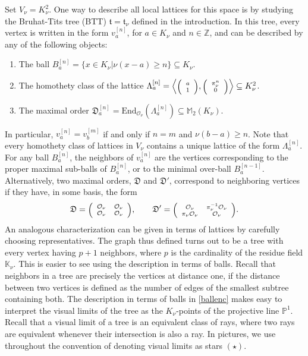 \documentclass{article}
\theoremstyle{definition}
\theoremstyle{remark}
\newcommand\sbmattrix[4]{\textnormal{\scriptsize$\left(\begin{array}{cc}#1&#2\\#3&#4\end{array}\right)$\normalsize}}
\newcommand\sbvecttor[2]{\textnormal{\scriptsize$\left(\begin{array}{cc}#1\\#2\end{array}\right)$\normalsize}}
\begin{document}
Set $V_{\nu}=K_{\nu}^2$. One way to describe all local 
lattices for this space
is by studying the Bruhat-Tits tree (BTT) 
$\mathfrak{t}=\mathfrak{t}_\nu$ defined in the
introduction. In this tree, every vertex is written 
in the form $v_a^{[n]}$,
for $a\in K_\nu$ and $n\in\mathbb{Z}$, and
can be described by any of the following objects:
\begin{enumerate}[label=($\heartsuit$\bf{\arabic*})]
    \item\label{ballenc} The ball $B_a^{[n]}=\{x\in K_\nu|
    \nu(x-a)\geq n\}\subseteq K_\nu$.
    \item The homothety class of the lattice 
    $\Lambda_a^{[n]}=
    \left\langle\sbvecttor a1,\sbvecttor{\pi_{\nu}^n}0\right\rangle
    \subseteq K_{\nu}^2$.
    \item The maximal order 
    $\mathfrak{D}_a^{[n]}=
    \mathrm{End}_{\mathcal{O}_{\nu}}\left(\Lambda_a^{[n]}\right)\subseteq
    \mathbb{M}_2(K_{\nu})$.
\end{enumerate}
In particular, $v_a^{[n]}=v_b^{[m]}$ if and only if
$n=m$ and $\nu(b-a)\geq n$.
Note that every homothety class of lattices in $V_{\nu}$ contains a
unique lattice of the form $\Lambda_a^{[n]}$. For any ball
$B_a^{[n]}$, the neighbors of $v_a^{[n]}$ are the vertices
corresponding to the proper maximal sub-balls of $B_a^{[n]}$,
or to the minimal over-ball $B_a^{[n-1]}$. Alternatively,
two maximal orders, $\mathfrak{D}$ and $\mathfrak{D}'$,
correspond to neighboring vertices if they have, in some basis,
the form
\begin{equation}\label{nord}
\mathfrak{D}=
\sbmattrix{\mathcal{O}_{\nu}}{\mathcal{O}_{\nu}}
{\mathcal{O}_{\nu}}{\mathcal{O}_{\nu}},
\qquad
\mathfrak{D}'=
\sbmattrix{\mathcal{O}_{\nu}}{\pi^{-1}_{\nu}\mathcal{O}_{\nu}}
{\pi_{\nu}\mathcal{O}_{\nu}}{\mathcal{O}_{\nu}}.\end{equation}
An analogous characterization can be given in terms of lattices
by carefully choosing representatives. 
 The graph thus defined turns out to be a tree with 
 every vertex having $p+1$ neighbors, where $p$ is the 
 cardinality of the residue field $\mathbb{K}_\nu$. This is easier to see using the description in terms of balls.
 Recall that neighbors in a tree are precisely
the vertices at distance one, if the distance between two
vertices is defined as the number of edges of the smallest
subtree containing both.
The description in terms of balls in \ref{ballenc}
makes easy to interpret the visual limits of the tree as the
$K_{\nu}$-points of the projective line
$\mathbb{P}^1$. Recall that a visual limit of a tree is an equivalent class
of rays, where two rays are equivalent whenever their intersection is also 
a ray. In pictures, we use throughout the convention of
denoting visual limits as stars $(\star)$.
\end{document}
